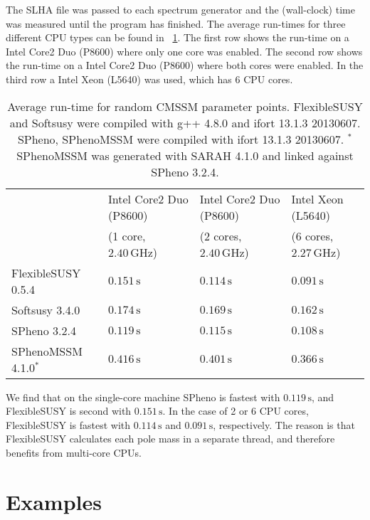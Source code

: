 \documentclass[final,3p,times,pdflatex]{elsarticle}
\newcommand{\unit}[1]{\,\text{#1}}      %
\begin{document}
%
The SLHA file was passed to each spectrum generator and the
(wall-clock) time was measured until the program has finished.  The
average run-times for three different CPU types can be found in
\tablename~\ref{tab:run-time-comparison}.  The first row shows the
run-time on a Intel Core2 Duo (P8600) where only one core was enabled.
The second row shows the run-time on a Intel Core2 Duo (P8600) where
both cores were enabled.  In the third row a Intel Xeon (L5640) was
used, which has $6$ CPU cores.
%
\begin{table}[tbh]
  \centering
  \begin{tabular}{llll}
    \toprule
                          & Intel Core2 Duo (P8600)    & Intel Core2 Duo (P8600)     & Intel Xeon (L5640)\\
                          & (1 core, $2.40\unit{GHz}$) & (2 cores, $2.40\unit{GHz}$) & (6 cores, $2.27\unit{GHz}$)\\
    \midrule
    FlexibleSUSY 0.5.4    & $0.151\unit{s}$    & $0.114\unit{s}$   & $0.091\unit{s}$\\
    Softsusy 3.4.0        & $0.174\unit{s}$    & $0.169\unit{s}$   & $0.162\unit{s}$\\
    SPheno 3.2.4          & $0.119\unit{s}$    & $0.115\unit{s}$   & $0.108\unit{s}$\\
    SPhenoMSSM 4.1.0${}^*$ & $0.416\unit{s}$    & $0.401\unit{s}$   & $0.366\unit{s}$\\
    \bottomrule
  \end{tabular}
  \caption{Average run-time for random CMSSM parameter points.
    FlexibleSUSY and Softsusy were compiled
    with g++ 4.8.0 and ifort 13.1.3 20130607.
    SPheno, SPhenoMSSM were
    compiled with ifort 13.1.3 20130607.
    ${}^*$SPhenoMSSM was generated with SARAH 4.1.0 and linked
    against SPheno 3.2.4.}
  \label{tab:run-time-comparison}
\end{table}
%
We find that on the single-core machine SPheno is fastest with
$0.119\unit{s}$, and FlexibleSUSY is second with $0.151\unit{s}$.  In
the case of 2 or 6 CPU cores, FlexibleSUSY is fastest with
$0.114\unit{s}$ and $0.091\unit{s}$, respectively.  The reason is that
FlexibleSUSY calculates each pole mass in a separate thread, and
therefore benefits from multi-core CPUs.

\appendix
\section{Examples}
\end{document}
